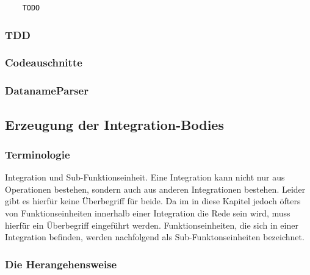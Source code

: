 	
	\begin{verbatim}
	TODO
	\end{verbatim}
	
	
	

	
	
	
	 \subsubsection{TDD}

	
	 \subsubsection{Codeauschnitte}
	
	 \subsubsection{DatanameParser}
	 

\subsection{Erzeugung der Integration-Bodies}
\label{sec:orgheadline51}


	 \subsubsection{Terminologie}

	Integration und Sub-Funktionseinheit. Eine Integration kann nicht nur aus
	Operationen bestehen, sondern auch aus anderen Integrationen bestehen.
	Leider gibt es hierfür keine Überbegriff für beide.
	Da im in diese Kapitel jedoch öfters von Funktionseinheiten innerhalb einer
	Integration die Rede sein wird, muss hierfür ein Überbegriff eingeführt
	werden. Funktionseinheiten, die sich in einer Integration befinden, werden
	nachfolgend als Sub-Funktonseinheiten bezeichnet.
	
	\subsubsection{Die Herangehensweise}

